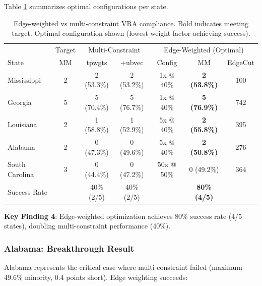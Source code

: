 Table \ref{tab:edge_weighting_summary} summarizes optimal configurations per state.

\begin{table}[h]
\centering
\begin{tabular}{lcccccc}
\toprule
& Target & \multicolumn{2}{c}{Multi-Constraint} & \multicolumn{3}{c}{Edge-Weighted (Optimal)} \\
State & MM & tpwgts & +ubvec & Config & MM & EdgeCut \\
\midrule
Mississippi & 2 & 2 (53.3\%) & 2 (53.2\%) & 1x @ 40\% & \textbf{2 (53.8\%)} & 100 \\
Georgia & 5 & 5 (70.4\%) & 5 (76.7\%) & 1x @ 40\% & \textbf{5 (76.9\%)} & 742 \\
Louisiana & 2 & 1 (58.8\%) & 1 (52.9\%) & 5x @ 40\% & \textbf{2 (55.8\%)} & 395 \\
Alabama & 2 & 0 (47.3\%) & 0 (49.6\%) & 5x @ 40\% & \textbf{2 (50.8\%)} & 276 \\
South Carolina & 3 & 0 (44.4\%) & 0 (47.2\%) & 50x @ 50\% & 0 (49.2\%) & 364 \\
\midrule
Success Rate & & 40\% (2/5) & 40\% (2/5) & & \textbf{80\% (4/5)} & \\
\bottomrule
\end{tabular}
\caption{Edge-weighted vs multi-constraint VRA compliance. Bold indicates meeting target. Optimal configuration shown (lowest weight factor achieving success).}
\label{tab:edge_weighting_summary}
\end{table}

\textbf{Key Finding 4}: Edge-weighted optimization achieves 80\% success rate (4/5 states), doubling multi-constraint performance (40\%).

\subsubsection{Alabama: Breakthrough Result}

Alabama represents the critical case where multi-constraint failed (maximum 49.6\% minority, 0.4 points short). Edge weighting succeeds:

